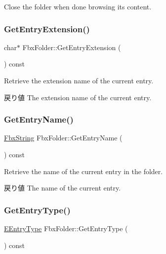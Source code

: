 Close the folder when done browsing its content. \mbox{\label{class_fbx_folder_a380385ead4cacb06613362f988f3634e}} 
\subsubsection{\texorpdfstring{Get\+Entry\+Extension()}{GetEntryExtension()}}
{\footnotesize\ttfamily char$\ast$ Fbx\+Folder\+::\+Get\+Entry\+Extension (\begin{DoxyParamCaption}{ }\end{DoxyParamCaption}) const}

Retrieve the extension name of the current entry. \begin{DoxyReturn}{戻り値}
The extension name of the current entry. 
\end{DoxyReturn}
\mbox{\label{class_fbx_folder_a893ff8805d32ab1c0bf614d07e706c0c}} 
\subsubsection{\texorpdfstring{Get\+Entry\+Name()}{GetEntryName()}}
{\footnotesize\ttfamily \hyperlink{class_fbx_string}{Fbx\+String} Fbx\+Folder\+::\+Get\+Entry\+Name (\begin{DoxyParamCaption}{ }\end{DoxyParamCaption}) const}

Retrieve the name of the current entry in the folder. \begin{DoxyReturn}{戻り値}
The name of the current entry. 
\end{DoxyReturn}
\mbox{\label{class_fbx_folder_a19057a425782659aeeda901f7888f804}} 
\subsubsection{\texorpdfstring{Get\+Entry\+Type()}{GetEntryType()}}
{\footnotesize\ttfamily \hyperlink{class_fbx_folder_aba9ef5b806b138dec254dfe5dedbb719}{E\+Entry\+Type} Fbx\+Folder\+::\+Get\+Entry\+Type (\begin{DoxyParamCaption}{ }\end{DoxyParamCaption}) const}

